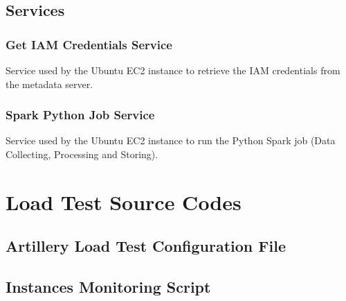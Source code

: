 \documentclass[12pt,oneside]{book} %
\begin{document}
\begin{subappendices}
    \newpage
    \subsection{Services}

    \subsubsection{Get IAM Credentials Service}
    Service used by the Ubuntu EC2 instance to retrieve the IAM credentials from
    the metadata server.\label{appendix:get-iam-credentials-service}
    

    \subsubsection{Spark Python Job Service}
    Service used by the Ubuntu EC2 instance to run the Python Spark job (Data
    Collecting, Processing and Storing).\label{appendix:spark-python-job-service}
    

    \newpage
    \section{Load Test Source Codes }

    \subsection{Artillery Load Test Configuration File}\label{appendix:artillery-load-test}
    

    \newpage
    \subsection{Instances Monitoring Script}\label{appendix:monitoring}
    
\end{subappendices}
\end{document}
